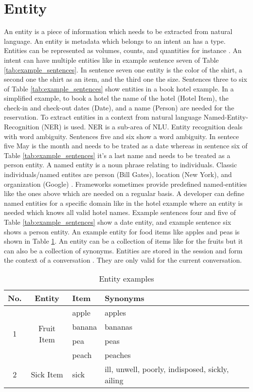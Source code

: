 \section{Entity} \label{sec:entity}
An entity is a piece of information which needs to be extracted from natural language.
An entity is metadata which belongs to an intent an has a type.
Entities can be represented as volumes, counts, and quantities for instance \cite{buiildChatbotsPython}.
An intent can have multiple entities like in example sentence seven of Table 
\ref{tab:example_sentences}.
In sentence seven one entity is the color of the shirt, 
a second one the shirt as an item, and the third one the size.
Sentences three to six of Table \ref{tab:example_sentences} show entities in a book hotel example.
In a simplified example, to book a hotel the name of the hotel (Hotel Item), 
the check-in and check-out dates (Date), 
and a name (Person) are needed for the reservation.
To extract entities in a context from natural language Named-Entity-Recognition (NER) is used.
NER is a sub-area of NLU.
Entity recognition deals with word ambiguity.
Sentences five and six show a word ambiguity.
In sentece five May is the month and needs to be trated as a date whereas in sentence six of Table \ref{tab:example_sentences} 
it's a last name and needs to be treated as a person entity. 
A named entity is a noun phrase relating to individuals.
Classic individuals/named entites are person (Bill Gates), location (New York), and organization (Google) \cite{geyer2016named}.
Frameworks sometimes provide predefined named-entities like the ones above which are needed
on a regualar basis.
A developer can define named entities for a specific domain like in the hotel example where an 
entity is needed which knows all valid hotel names.
Example sentences four and five of Table \ref{tab:example_sentences} show a date entity,
and example sentence six shows a person entity.
An example entity for food items like apples and peas is shown in Table \ref{tab:entityexampledialog}.
An entity can be a collection of items like for the fruits but it can also be a collection of synonyms.
Entities are stored in the session and form the context of a conversation \cite{singhbuilding}.
They are only valid for the current conversation.

\begin{table}[H]
    \centering
    \begin{tabular}{ c | c | l | l }
  No. & Entity & Item & Synonyms \\ \hline \hline
  \multirow{4}{*}{1} & \multirow{4}{*}{Fruit Item} & apple & apples \\
       & & banana & bananas\\
       & & pea & peas \\ 
       & & peach & peaches \\ \hline
    2 & Sick Item & sick & ill, unwell, poorly, indisposed, sickly, ailing \\
    \hline
\end{tabular}
    \caption{Entity examples} \label{tab:entityexampledialog}
\end{table} \noindent


